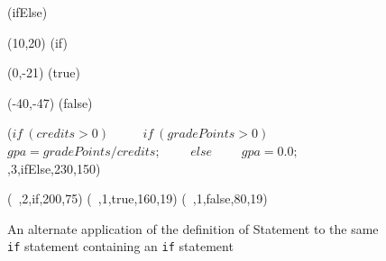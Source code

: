 




\begin {figure}

\Draw

\MarkLoc(ifElse)

\Move(10,20) 
\MarkLoc(if)

\Move(0,-21)
\MarkLoc(true)

\Move(-40,-47)
\MarkLoc(false)


\boxIt($if~(credits > 0)$ \hfill			~~~~
  	\hspace{10pt}$if~(gradePoints > 0)$\hfill	~~~~
       	\hspace{20pt} $gpa = gradePoints / credits;$\hfill ~~~~
	$else$\hfill			~~~~
	\hspace{10pt}$gpa = 0.0;$ \hfill
	,3,ifElse,230,150)

\boxIt(~,2,if,200,75)
\boxIt(~,1,true,160,19)
\boxIt(~,1,false,80,19)



\EndDraw

\caption {An alternate application of the definition of 
Statement to the same \texttt{if} statement
containing an \texttt{if} statement} 

\label {fig:ifStmtAmb2}

\end {figure}


